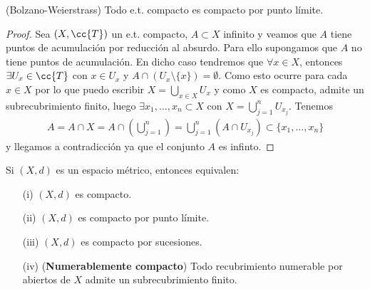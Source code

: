 \begin{prop}
    (Bolzano-Weierstrass) Todo e.t. compacto es compacto por punto límite.
    \begin{proof}
        Sea $(X, \cc{T})$ un e.t. compacto, $A\subset X$ infinito y veamos que $A$ tiene puntos de acumulación por reducción al absurdo. Para ello supongamos que $A$ no tiene puntos de acumulación. En dicho caso tendremos que $\forall x \in X$, entonces $\exists U_x\in \cc{T}$ con $x\in U_x$ y $A\cap(U_x\setminus \{x\})=\emptyset$. Como esto ocurre para cada $x\in X$ por lo que puedo escribir $X=\bigcup\limits_{x\in X}U_x$ y como $X$ es compacto, admite un subrecubrimiento finito, luego $\exists x_1,\dots,x_n\subset X$ con $X=\bigcup\limits_{j=1}^n U_{x_j}$. Tenemos
        \begin{align*}
            A=A\cap X = A \cap \left(\bigcup\limits_{j=1}^n\right) = \bigcup\limits_{j=1}^n(A\cap U_{x_j})\subset \{x_1,\dots,x_n\}
        \end{align*} 
        y llegamos a contradicción ya que el conjunto $A$ es infinto.

    \end{proof}
\end{prop}

\begin{teo}
    Si $(X, d)$ es un espacio métrico, entonces equivalen:
    \begin{enumerate}
        \item[(i)] $(X, d)$ es compacto.
        \item[(ii)] $(X, d)$ es compacto por punto límite.
        \item[(iii)] $(X, d)$ es compacto por sucesiones.
        \item[(iv)] (\textbf{Numerablemente compacto}) Todo recubrimiento numerable por abiertos de $X$ admite un subrecubrimiento finito.
    \end{enumerate}
\end{teo}


